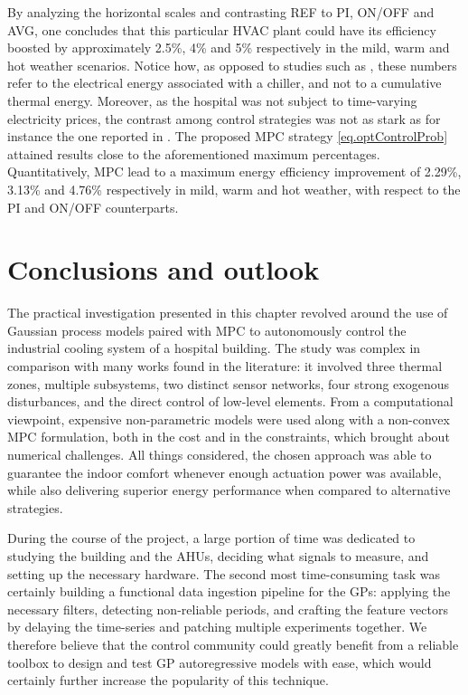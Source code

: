 By analyzing the horizontal scales and contrasting REF to PI, ON/OFF and AVG, one concludes that this particular HVAC plant could have its efficiency boosted by approximately 2.5\%, 4\% and 5\% respectively in the mild, warm and hot weather scenarios. Notice how, as opposed to studies such as \cite{bunning2020experimental}, these numbers refer to the electrical energy associated with a chiller, and not to a cumulative thermal energy. Moreover, as the hospital was not subject to time-varying electricity prices, the contrast among control strategies was not as stark as for instance the one reported in \cite{joe2022investigation}. The proposed MPC strategy \eqref{eq.optControlProb} attained results close to the aforementioned maximum percentages. Quantitatively, MPC lead to a maximum energy efficiency improvement of 2.29\%, 3.13\% and 4.76\% respectively in mild, warm and hot weather, with respect to the PI and ON/OFF counterparts.

\section{Conclusions and outlook}

The practical investigation presented in this chapter revolved around the use of Gaussian process models paired with MPC to autonomously control the industrial cooling system of a hospital building. The study was complex in comparison with many works found in the literature: it involved three thermal zones, multiple subsystems, two distinct sensor networks, four strong exogenous disturbances, and the direct control of low-level elements. From a computational viewpoint, expensive non-parametric models were used along with a non-convex MPC formulation, both in the cost and in the constraints, which brought about numerical challenges. All things considered, the chosen approach was able to guarantee the indoor comfort whenever enough actuation power was available, while also delivering superior energy performance when compared to alternative strategies.

During the course of the project, a large portion of time was dedicated to studying the building and the AHUs, deciding what signals to measure, and setting up the necessary hardware. The second most time-consuming task was certainly building a functional data ingestion pipeline for the GPs: applying the necessary filters, detecting non-reliable periods, and crafting the feature vectors by delaying the time-series and patching multiple experiments together. We therefore believe that the control community could greatly benefit from a reliable toolbox to design and test GP autoregressive models with ease, which would certainly further increase the popularity of this technique. 

